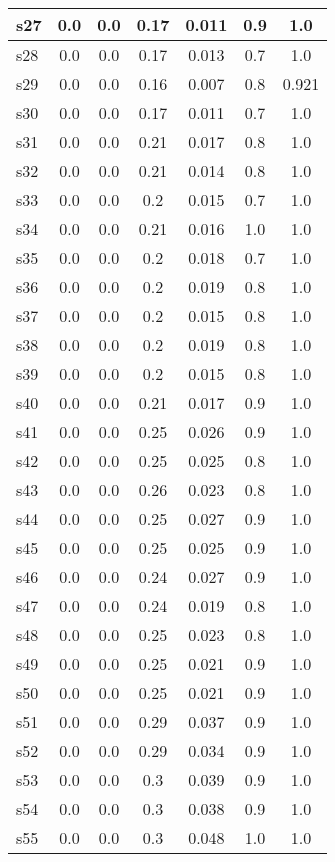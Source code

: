 \documentclass{article}
\begin{document}
\begin{tabular}{|l|c|c|c|c|c|c|}
\hline
s27 &0.0 & 0.0 & 0.17 & 0.011 & 0.9 & 1.0\\
\hline
s28 &0.0 & 0.0 & 0.17 & 0.013 & 0.7 & 1.0\\
\hline
s29 &0.0 & 0.0 & 0.16 & 0.007 & 0.8 & 0.921\\
\hline
s30 &0.0 & 0.0 & 0.17 & 0.011 & 0.7 & 1.0\\
\hline
s31 &0.0 & 0.0 & 0.21 & 0.017 & 0.8 & 1.0\\
\hline
s32 &0.0 & 0.0 & 0.21 & 0.014 & 0.8 & 1.0\\
\hline
s33 &0.0 & 0.0 & 0.2 & 0.015 & 0.7 & 1.0\\
\hline
s34 &0.0 & 0.0 & 0.21 & 0.016 & 1.0 & 1.0\\
\hline
s35 &0.0 & 0.0 & 0.2 & 0.018 & 0.7 & 1.0\\
\hline
s36 &0.0 & 0.0 & 0.2 & 0.019 & 0.8 & 1.0\\
\hline
s37 &0.0 & 0.0 & 0.2 & 0.015 & 0.8 & 1.0\\
\hline
s38 &0.0 & 0.0 & 0.2 & 0.019 & 0.8 & 1.0\\
\hline
s39 &0.0 & 0.0 & 0.2 & 0.015 & 0.8 & 1.0\\
\hline
s40 &0.0 & 0.0 & 0.21 & 0.017 & 0.9 & 1.0\\
\hline
s41 &0.0 & 0.0 & 0.25 & 0.026 & 0.9 & 1.0\\
\hline
s42 &0.0 & 0.0 & 0.25 & 0.025 & 0.8 & 1.0\\
\hline
s43 &0.0 & 0.0 & 0.26 & 0.023 & 0.8 & 1.0\\
\hline
s44 &0.0 & 0.0 & 0.25 & 0.027 & 0.9 & 1.0\\
\hline
s45 &0.0 & 0.0 & 0.25 & 0.025 & 0.9 & 1.0\\
\hline
s46 &0.0 & 0.0 & 0.24 & 0.027 & 0.9 & 1.0\\
\hline
s47 &0.0 & 0.0 & 0.24 & 0.019 & 0.8 & 1.0\\
\hline
s48 &0.0 & 0.0 & 0.25 & 0.023 & 0.8 & 1.0\\
\hline
s49 &0.0 & 0.0 & 0.25 & 0.021 & 0.9 & 1.0\\
\hline
s50 &0.0 & 0.0 & 0.25 & 0.021 & 0.9 & 1.0\\
\hline
s51 &0.0 & 0.0 & 0.29 & 0.037 & 0.9 & 1.0\\
\hline
s52 &0.0 & 0.0 & 0.29 & 0.034 & 0.9 & 1.0\\
\hline
s53 &0.0 & 0.0 & 0.3 & 0.039 & 0.9 & 1.0\\
\hline
s54 &0.0 & 0.0 & 0.3 & 0.038 & 0.9 & 1.0\\
\hline
s55 &0.0 & 0.0 & 0.3 & 0.048 & 1.0 & 1.0\\

\end{tabular}
\end{document}
